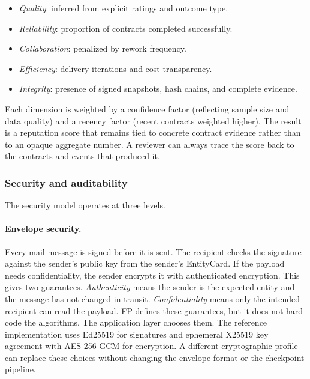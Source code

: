 \begin{itemize}[nosep]
    \item \emph{Quality}: inferred from explicit ratings and outcome
      type.
    \item \emph{Reliability}: proportion of contracts completed
      successfully.
    \item \emph{Collaboration}: penalized by rework frequency.
    \item \emph{Efficiency}: delivery iterations and cost transparency.
    \item \emph{Integrity}: presence of signed snapshots, hash chains,
      and complete evidence.
\end{itemize}

\noindent Each dimension is weighted by a confidence factor (reflecting
sample size and data quality) and a recency factor (recent contracts
weighted higher).  The result is a reputation score that remains tied to concrete contract evidence rather than to an opaque aggregate number. A reviewer can always trace the score back to the contracts and events that produced it.

\subsubsection{Security and auditability}

The security model operates at three levels.

\paragraph{Envelope security.}
Every mail message is signed before it is sent. The recipient checks the signature against the sender's public key from the sender's EntityCard. If the payload needs confidentiality, the sender encrypts it with authenticated encryption.
This gives two guarantees. \emph{Authenticity} means the sender is the expected entity and the message has not changed in transit. \emph{Confidentiality} means only the intended recipient can read the payload.
FP defines these guarantees, but it does not hard-code the algorithms. The application layer chooses them. The reference implementation uses Ed25519 for signatures and ephemeral X25519 key agreement with AES-256-GCM for encryption. A different cryptographic profile can replace these choices without changing the envelope format or the checkpoint pipeline.

